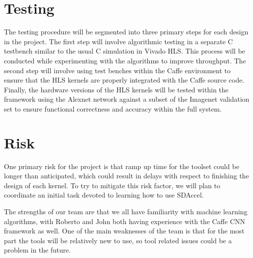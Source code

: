 \documentclass[conference,compsoc]{IEEEtran/IEEEtran}
\begin{document}
\section{Testing}\label{section:testing}
The testing procedure will be segmented into three primary steps for each design in the project.
The first step will involve algorithmic testing in a separate C testbench similar to the usual C
simulation in Vivado HLS. This process will be conducted while experimenting with the algorithms
to improve throughput. The second step will involve using test benches within the Caffe environment
to ensure that the HLS kernels are properly integrated with the Caffe source code. Finally, the
hardware versions of the HLS kernels will be tested within the framework using the Alexnet network
against a subset of the Imagenet validation set to ensure functional correctness and accuracy
within the full system.

\section{Risk}\label{section:risk}

One primary risk for the project is that ramp up time for the toolset could be longer than 
anticipated, which could result in delays with respect to finishing the design of each kernel. 
To try to mitigate this risk factor, we will plan to coordinate an initial task devoted to
learning how to use SDAccel. 

The strengths of our team are that we all have familiarity with machine learning algorithms,
with Roberto and John both having experience with the Caffe CNN framework as well. One of the 
main weaknesses of the team is that for the most part the tools will be relatively new to use,
so tool related issues could be a problem in the future. 
\end{document}
